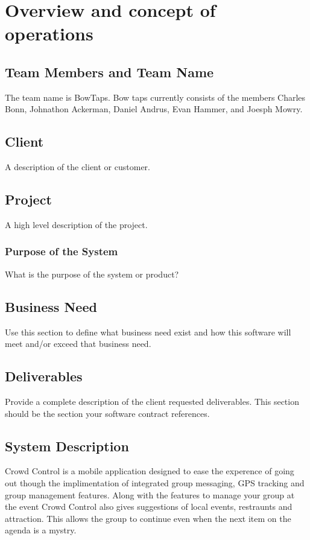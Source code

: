 

\chapter{Overview and concept of operations}


\section{Team Members and Team Name}

The team name is BowTaps. Bow taps currently consists of the members Charles Bonn, Johnathon Ackerman, Daniel Andrus, Evan Hammer, and Joesph Mowry.

\section{Client}
A description of the client or customer.

\section{Project}
A high level description of the project.

\subsection{Purpose of the System}
What is the purpose of the system or product? 


\section{Business Need}
Use this section to define what business need exist and how this software will 
meet and/or exceed that business need.   


\section{Deliverables}

Provide a complete description of the client requested deliverables.   This section should be the section your software contract references.   

\section{System Description}
Crowd Control is a mobile application designed to ease the experence of going out though the implimentation of integrated group messaging, GPS tracking and group management features. Along with the features to manage your group at the event Crowd Control also gives suggestions of local events, restraunts and attraction. This allows the group to continue even when the next item on the agenda is a mystry. 


